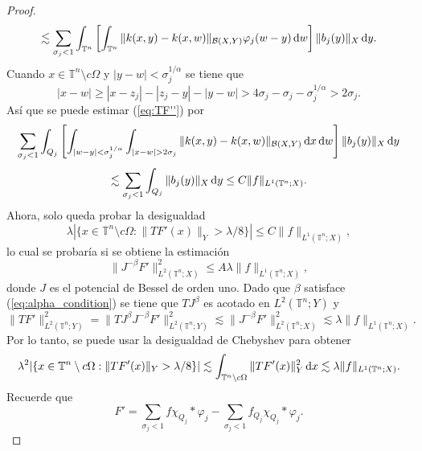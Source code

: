 \begin{proof}
\begin{equation*}
		\lesssim \sum_{\sigma_j< 1}\int_{\mathbb{T}^n}\left[\int_{\mathbb{T}^n}\|k(x, y) - k(x, w)\|_{\mathcal{B}(X,Y)}\varphi_j(w-y)\mathop{}\!\mathrm{d} w\right] \|b_j(y)\|_X\mathop{}\!\mathrm{d} y.
	\end{equation*}
	Cuando $x \in \mathbb{T}^n \setminus c\Omega$ y $|y - w| < \sigma_j^{1/\alpha}$ se tiene que
	\begin{equation*}
		|x-w| \geq |x-z_j| - |z_j - y| - |y - w| > 4\sigma_j - \sigma_j - \sigma_j^{1/\alpha} > 2\sigma_j.
	\end{equation*}
	Así que se puede estimar (\ref{eq:TF''}) por
	\begin{equation*}
		\sum_{\sigma_j< 1}\int_{Q_j}\left[\int_{|w-y|<\sigma_j^{1/\alpha}}\int_{|x-w|>2\sigma_j}\|k(x, y) - k(x, w)\|_{\mathcal{B}(X,Y)}\diff x \diff w\right] \|b_j(y)\|_X\diff y
	\end{equation*}
	\begin{equation*}
		\lesssim \sum_{\sigma_j<1} \int_{Q_j}\|b_j(y)\|_X\mathop{}\!\mathrm{d} y  \leq C\|f\|_{L^1(\mathbb{T}^n; X)}.
	\end{equation*}
	Ahora, solo queda probar la desigualdad
	\begin{equation*}
		\lambda |\{ x \in \mathbb{T}^n \setminus c\Omega : \|TF'(x)\|_Y > \lambda/8 \}| \leq C\|f\|_{L^1(\mathbb{T}^n; X)},
	\end{equation*}
	lo cual se probaría si se obtiene la estimación
	\begin{equation}
		\|J^{-\beta} F'\|_{L^2(\mathbb{T}^n; X)}^2 \leq A\lambda \|f\|_{L^1(\mathbb{T}^n; X)},
	\end{equation}
	donde $J$ es el potencial de Bessel de orden uno. Dado que $\beta$ satisface (\ref{eq:alpha_condition}) se tiene que $TJ^{\beta}$ es acotado en $L^2(\mathbb{T}^n;Y)$ y
	\begin{equation*}
		\|T F'\|_{L^2(\mathbb{T}^n; Y)}^2 =\|TJ^{\beta}J^{-\beta }F'\|_{L^2(\mathbb{T}^n; Y)}^2 \lesssim \|J^{-\beta} F'\|_{L^2(\mathbb{T}^n; X)}^2 \lesssim \lambda \|f\|_{L^1(\mathbb{T}^n; X)}.
	\end{equation*}
	Por lo tanto, se puede usar la desigualdad de Chebyshev para obtener
	\begin{equation*}
		\lambda^2 |\{ x \in \mathbb{T}^n \setminus c\Omega : \|TF'(x)\|_Y > \lambda/8 \}| \lesssim  \int_{\mathbb{T}^n \setminus c\Omega} \|TF'(x)\|_Y^2\mathop{}\!\mathrm{d} x  \lesssim \lambda\|f\|_{L^1(\mathbb{T}^n; X)}.
	\end{equation*}
	Recuerde que
	\begin{equation*}
		F' = \sum_{\sigma_j < 1}f\chi_{Q_j} * \varphi_j - \sum_{\sigma_j < 1}f_{Q_j}\chi_{Q_j}*\varphi_j.

\end{equation*}
\end{proof}
